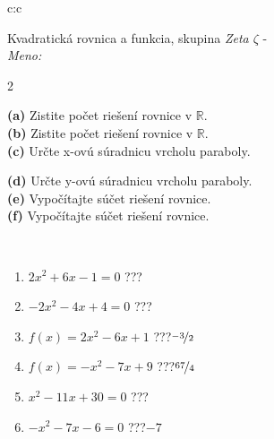 \documentclass[10pt]{report}
\begin{document}
\begin{tabular}{c:c}
\begin{minipage}[c][104.5mm][t]{0.5\linewidth}
\begin{center}
\vspace{7mm}
{\huge {\LARGE Kvadratická rovnica a funkcia}, skupina \textit{Zeta $\zeta$} -}\\[5mm]
\textit{Meno:}\phantom{xxxxxxxxxxxxxxxxxxxxxxxxxxxxxxxxxxxxxxxxxxxxxxxxxxxxxxxxxxxxxxxxx}\\[5mm]
\begin{minipage}{0.95\linewidth}
\begin{center}
{\small \begin{multicols}{2} \raggedright
\textbf{(a)} Zistite počet riešení rovnice v \(\mathbb{R}\). \\[1mm]
\textbf{(b)} Zistite počet riešení rovnice v \(\mathbb{R}\). \\[1mm]
\textbf{(c)} Určte x-ovú súradnicu vrcholu paraboly. \par \columnbreak
\textbf{(d)} Určte y-ovú súradnicu vrcholu paraboly. \\[1mm]
\textbf{(e)} Vypočítajte súčet riešení rovnice. \\[1mm]
\textbf{(f)} Vypočítajte súčet riešení rovnice.
\end{multicols}
}
\end{center}
\end{minipage}
\\[4mm]
\begin{minipage}{0.79\linewidth}
\begin{center}
\begin{varwidth}{\linewidth}
\begin{enumerate}
\Large
\item $2x^2+6x-1=0$\quad \dotfill\; ???\;\dotfill {}
\item $-2x^2-4x+4=0$\quad \dotfill\; ???\;\dotfill {}
\item $f(x)=2x^2-6x+1$\quad \dotfill\; ???\;\dotfill \quad $\nicefrac{-3}{2}$
\item $f(x)=-x^2-7x+9$\quad \dotfill\; ???\;\dotfill \quad $\nicefrac{67}{4}$
\item $x^2-11x+30=0$\quad \dotfill\; ???\;\dotfill {}
\item $-x^2-7x-6=0$\quad \dotfill\; ???\;\dotfill \quad $-7$
\end{enumerate}
\end{varwidth}
\end{center}
\end{minipage}

\end{center}
\end{minipage}
\end{tabular}
\end{document}
